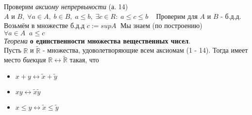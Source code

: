 \documentclass[a4paper, 12pt]{article}
\begin{document}
    Проверим \textit{аксиому непрервыности} (а. 14)\\
    $A$ и $B ,\; \forall a \in A ,\; b \in B ,\; a \le b ,\; \exists c \in R :\; a \le c \le b \;\;\;$ Проверим для $A$ и $B$ - б.д.д. \\
    Возьмём в множестве б.д.д $c := sup A\;$ Мы знаем (по построению) $\forall a \in A \;\; a \le c\;\;$
    \\
    \textit{Теорема} \textbf{о единственности множества вещественных чисел}. \\
    Пусть $\mathbb{R}$ и $\widetilde{\mathbb{R}}$ - множества, удоволетворяющие всем аксиомам (1 - 14). Тогда имеет место \textit{биекция} $\mathbb{R} \longleftrightarrow \widetilde{\mathbb{R}}$ такая, что
    \begin{itemize}
        \item $ x + y \leftrightarrow \widetilde{x} + \widetilde{y} $
        \item $ xy \leftrightarrow \widetilde{x}\widetilde{y} $
        \item $ x \le y \leftrightarrow \widetilde{x} \le \widetilde{y} $
    \end{itemize}
\end{document}

